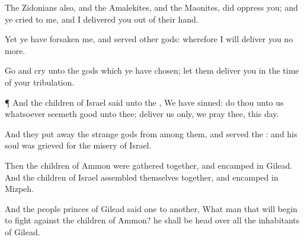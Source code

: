 {The
Zidonians also, and the
Amalekites, and the
Maonites, did
oppress you; and ye
cried to me, and I
delivered you out of their
hand.

Yet ye have
forsaken me, and
served
other
gods: wherefore I will
deliver you no
more.

Go and
cry unto the
gods which ye have
chosen; let
them
deliver you in the
time of your
tribulation.


\par }{\PP {}¶ And the
children of
Israel
said unto the
{}, We have
sinned:
do thou unto us whatsoever
seemeth
good unto thee;
deliver us only, we pray thee, this
day.

And they put
away the
strange
gods from
among them, and
served the
{}: and his
soul was
grieved for the
misery of
Israel.

Then the
children of
Ammon were gathered
together, and
encamped in
Gilead. And the
children of
Israel assembled themselves
together, and
encamped in
Mizpeh.

And the
people
{}
princes of
Gilead
said
one to
another, What
man
{} that will
begin to
fight against the
children of
Ammon? he shall be
head over all the
inhabitants of
Gilead.




\par }
